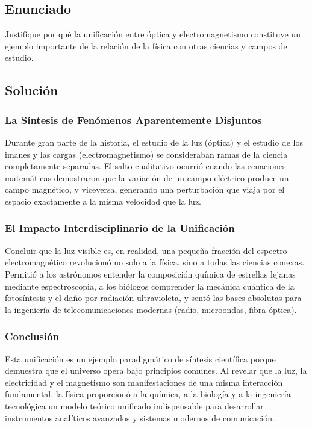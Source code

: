\documentclass[12pt, a4paper]{article}
\begin{document}
\newpage

\subsection*{Enunciado}
Justifique por qué la unificación entre óptica y electromagnetismo constituye un ejemplo importante de la relación de la física con otras ciencias y campos de estudio.

\subsection*{Solución}

\subsubsection*{La Síntesis de Fenómenos Aparentemente Disjuntos}
Durante gran parte de la historia, el estudio de la luz (óptica) y el estudio de los imanes y las cargas (electromagnetismo) se consideraban ramas de la ciencia completamente separadas. El salto cualitativo ocurrió cuando las ecuaciones matemáticas demostraron que la variación de un campo eléctrico produce un campo magnético, y viceversa, generando una perturbación que viaja por el espacio exactamente a la misma velocidad que la luz.

\subsubsection*{El Impacto Interdisciplinario de la Unificación}
Concluir que la luz visible es, en realidad, una pequeña fracción del espectro electromagnético revolucionó no solo a la física, sino a todas las ciencias conexas. Permitió a los astrónomos entender la composición química de estrellas lejanas mediante espectroscopia, a los biólogos comprender la mecánica cuántica de la fotosíntesis y el daño por radiación ultravioleta, y sentó las bases absolutas para la ingeniería de telecomunicaciones modernas (radio, microondas, fibra óptica).

\subsubsection*{Conclusión}
Esta unificación es un ejemplo paradigmático de síntesis científica porque demuestra que el universo opera bajo principios comunes. Al revelar que la luz, la electricidad y el magnetismo son manifestaciones de una misma interacción fundamental, la física proporcionó a la química, a la biología y a la ingeniería tecnológica un modelo teórico unificado indispensable para desarrollar instrumentos analíticos avanzados y sistemas modernos de comunicación.
\end{document}

